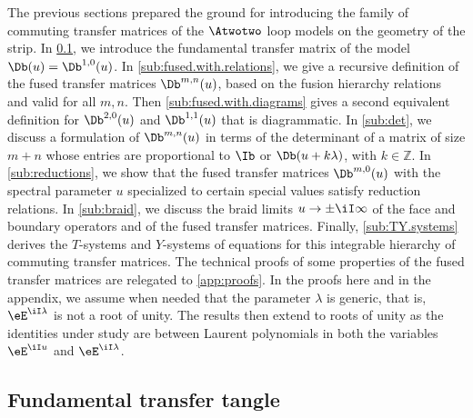 \documentclass[11pt]{article}
\numberwithin{equation}{section}
\theoremstyle{alexi}
\begin{document}
The previous sections prepared the ground for introducing the family of commuting transfer matrices of the $\Atwotwo$ loop models on the geometry of the strip. In \cref{sub:fundamental}, we introduce the fundamental transfer matrix of the model $\Db(u) = \Db^{1,0}(u)$. In \cref{sub:fused.with.relations}, we give a recursive definition of the fused transfer matrices $\Db^{m,n}(u)$, based on the fusion hierarchy relations and valid for all $m,n$. Then \cref{sub:fused.with.diagrams} gives a second equivalent definition for $\Db^{2,0}(u)$ and $\Db^{1,1}(u)$ that is diagrammatic. In \cref{sub:det}, we discuss a formulation of $\Db^{m,n}(u)$ in terms of the determinant of a matrix of size $m+n$ whose entries are proportional to $\Ib$ or $\Db(u+k\lambda)$, with $k \in \mathbb Z$. In \cref{sub:reductions}, we show that the fused transfer matrices $\Db^{m,0}(u)$ with the spectral parameter $u$ specialized to certain special values satisfy reduction relations. In \cref{sub:braid}, we discuss the braid limits $u\to \pm \iI \infty$ of the face and boundary operators and of the fused transfer matrices. Finally, \cref{sub:TY.systems} derives the $T$-systems and $Y$-systems of equations for this integrable hierarchy of commuting transfer matrices. The technical proofs of some properties of the fused transfer matrices are relegated to \cref{app:proofs}. In the proofs here and in the appendix, we assume when needed that the parameter $\lambda$ is generic, that is, $\eE^{\iI\lambda}$ is not a root of unity. The results then extend to roots of unity as the identities under study are between Laurent polynomials in both the variables $\eE^{\iI u}$ and $\eE^{\iI\lambda}$.

\subsection{Fundamental transfer tangle} \label{sub:fundamental}
\end{document}
